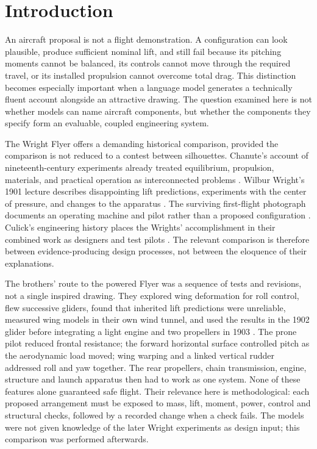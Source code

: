 \documentclass[11pt,a4paper]{article}
\begin{document}
\section{Introduction}
An aircraft proposal is not a flight demonstration. A configuration can look plausible, produce sufficient nominal lift, and still fail because its pitching moments cannot be balanced, its controls cannot move through the required travel, or its installed propulsion cannot overcome total drag. This distinction becomes especially important when a language model generates a technically fluent account alongside an attractive drawing. The question examined here is not whether models can name aircraft components, but whether the components they specify form an evaluable, coupled engineering system.

The Wright Flyer offers a demanding historical comparison, provided the comparison is not reduced to a contest between silhouettes. Chanute's account of nineteenth-century experiments already treated equilibrium, propulsion, materials, and practical operation as interconnected problems \cite{ref1}. Wilbur Wright's 1901 lecture describes disappointing lift predictions, experiments with the center of pressure, and changes to the apparatus \cite{ref2}. The surviving first-flight photograph documents an operating machine and pilot rather than a proposed configuration \cite{ref4}. Culick's engineering history places the Wrights' accomplishment in their combined work as designers and test pilots \cite{ref5}. The relevant comparison is therefore between evidence-producing design processes, not between the eloquence of their explanations.

The brothers' route to the powered Flyer was a sequence of tests and revisions, not a single inspired drawing. They explored wing deformation for roll control, flew successive gliders, found that inherited lift predictions were unreliable, measured wing models in their own wind tunnel, and used the results in the 1902 glider before integrating a light engine and two propellers in 1903 \cite{ref2,ref35}. The prone pilot reduced frontal resistance; the forward horizontal surface controlled pitch as the aerodynamic load moved; wing warping and a linked vertical rudder addressed roll and yaw together. The rear propellers, chain transmission, engine, structure and launch apparatus then had to work as one system. None of these features alone guaranteed safe flight. Their relevance here is methodological: each proposed arrangement must be exposed to mass, lift, moment, power, control and structural checks, followed by a recorded change when a check fails. The models were not given knowledge of the later Wright experiments as design input; this comparison was performed afterwards.
\end{document}
